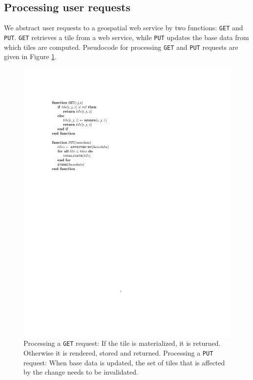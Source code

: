 \documentclass[11pt, oneside]{report}
\begin{document}
{\subsection{Processing user requests}
\label{sec:processing:user:requests}
We abstract user requests to a geospatial web service by two functions: \texttt{GET} and \texttt{PUT}. \texttt{GET} retrieves a tile from a web service, while \texttt{PUT} updates the base data from which tiles are computed. Pseudocode for processing \texttt{GET} and \texttt{PUT} requests are given in Figure \ref{fig:pseudocode}.

\begin{figure}[ht]
\includegraphics[scale=0.9]{figs-tileheat/pseudocode}
\caption{Processing a \texttt{GET} request: If the tile is materialized, it is returned. Otherwise it is rendered, stored and returned. Processing a \texttt{PUT} request: When base data is updated, the set of tiles that is affected by the change needs to be invalidated.}
\label{fig:pseudocode}
\end{figure}

}
\end{document}

